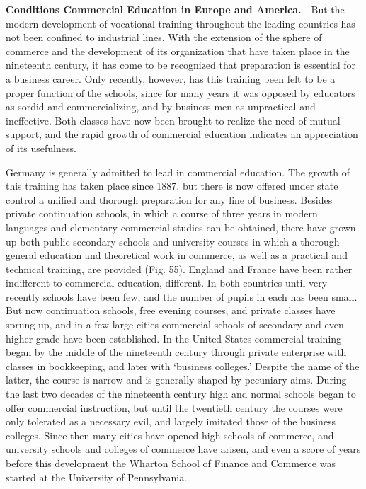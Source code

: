 \documentclass[]{book}
\begin{document}
\textbf{Conditions Commercial Education in Europe and America.} - But the modern development of vocational training throughout the leading countries has not been confined to industrial lines. With the extension of the sphere of commerce and the development of its organization that have taken place in the nineteenth century, it has come to be recognized that preparation is essential for a business career. Only recently, however, has this training been felt to be a proper function of the schools, since for many years it was opposed by educators as sordid and commercializing, and by business men as unpractical and ineffective. Both classes have now been brought to realize the need of mutual support, and the rapid growth of commercial education indicates an appreciation of its usefulness.

Germany is generally admitted to lead in commercial education. The growth of this training has taken place since 1887, but there is now offered under state control a unified and thorough preparation for any line of business. Besides private continuation schools, in which a course of three years in modern languages and elementary commercial studies can be obtained, there have grown up both public secondary schools and university courses in which a thorough general education and theoretical work in commerce, as well as a practical and technical training, are provided (Fig. 55). England and France have been rather indifferent to commercial education, different. In both countries until very recently schools have been few, and the number of pupils in each has been small. But now continuation schools, free evening courses, and private classes have sprung up, and in a few large cities commercial schools of secondary and even higher grade have been established. In the United States commercial training began by the middle of the nineteenth century through private enterprise with classes in bookkeeping, and later with `business colleges.' Despite the name of the latter, the course is narrow and is generally shaped by pecuniary aims. During the last two decades of the nineteenth century high and normal schools began to offer commercial instruction, but until the twentieth century the courses were only tolerated as a necessary evil, and largely imitated those of the business colleges. Since then many cities have opened high schools of commerce, and university schools and colleges of commerce have arisen, and even a score of years before this development the Wharton School of Finance and Commerce was started at the University of Pennsylvania.
\end{document}
